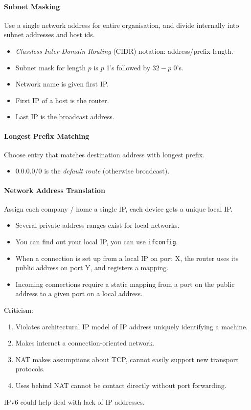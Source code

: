 \documentclass[twocolumn,english]{article}
\begin{document}
\paragraph{Subnet Masking}

Use a single network address for entire organisation, and divide internally
into subnet addresses and host ids.
\begin{itemize}
\item \emph{Classless Inter-Domain Routing} (CIDR) notation: address/prefix-length.
\item Subnet mask for length $p$ is $p$ 1's followed by $32-p$ 0's.
\item Network name is given first IP.
\item First IP of a host is the router.
\item Last IP is the broadcast address.
\end{itemize}

\paragraph{Longest Prefix Matching}

Choose entry that matches destination address with longest prefix.
\begin{itemize}
\item 0.0.0.0/0 is the \emph{default route} (otherwise broadcast).
\end{itemize}

\paragraph{Network Address Translation}

Assign each company / home a single IP, each device gets a unique
local IP.
\begin{itemize}
\item Several private address ranges exist for local networks.
\item You can find out your local IP, you can use \texttt{ifconfig}.
\item When a connection is set up from a local IP on port X, the router
uses its public address on port Y, and registers a mapping.
\item Incoming connections require a static mapping from a port on the public
address to a given port on a local address.
\end{itemize}
Criticism:
\begin{enumerate}
\item Violates architectural IP model of IP address uniquely identifying
a machine.
\item Makes internet a connection-oriented network.
\item NAT makes assumptions about TCP, cannot easily support new transport
protocols.
\item Uses behind NAT cannot be contact directly without port forwarding.
\end{enumerate}
IPv6 could help deal with lack of IP addresses.
\end{document}
